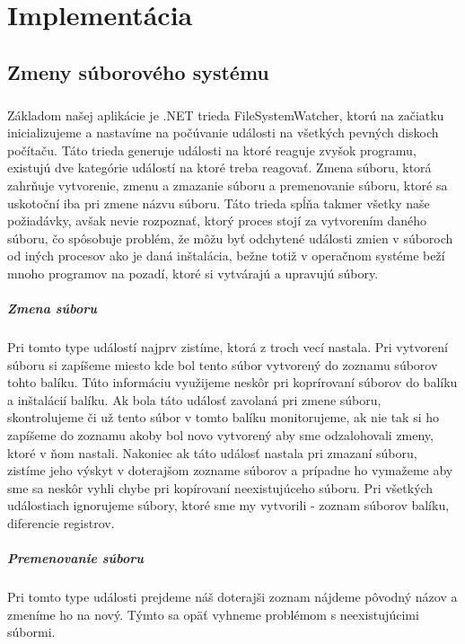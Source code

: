\chapter{Implementácia}

\section{Zmeny súborového systému}
\paragraph{}
Základom našej aplikácie je .NET trieda FileSystemWatcher, ktorú na začiatku inicializujeme a nastavíme na počúvanie události na všetkých pevných diskoch počítaču. Táto trieda generuje události na ktoré reaguje zvyšok programu, existujú dve kategórie událostí na ktoré treba reagovať. Zmena súboru, ktorá zahrňuje vytvorenie, zmenu a zmazanie súboru a premenovanie súboru, ktoré sa uskotoční iba pri zmene názvu súboru. Táto trieda spĺňa takmer všetky naše požiadávky, avšak nevie rozpoznať, ktorý proces stojí za vytvorením daného súboru, čo spôsobuje problém, že môžu byť odchytené události zmien v súboroch od iných procesov ako je daná inštalácia, bežne totiž v operačnom systéme beží mnoho programov na pozadí, ktoré si vytvárajú a upravujú súbory.

\paragraph{Zmena súboru}
Pri tomto type událostí najprv zistíme, ktorá z troch vecí nastala. Pri vytvorení súboru si zapíšeme miesto kde bol tento súbor vytvorený do zoznamu súborov tohto balíku. Túto informáciu využijeme neskôr pri koprírovaní súborov do balíku a inštalácií balíku. Ak bola táto událosť zavolaná pri zmene súboru, skontrolujeme či už tento súbor v tomto balíku monitorujeme, ak nie tak si ho zapíšeme do zoznamu akoby bol novo vytvorený aby sme odzalohovali zmeny, ktoré v ňom nastali. Nakoniec ak táto událosť nastala pri zmazaní súboru, zistíme jeho výskyt v doterajšom zozname súborov a prípadne ho vymažeme aby sme sa neskôr vyhli chybe pri kopírovaní neexistujúceho súboru. Pri všetkých událostiach ignorujeme súbory, ktoré sme my vytvorili - zoznam súborov balíku, diferencie registrov.

\paragraph{Premenovanie súboru}
Pri tomto type události prejdeme náš doterajši zoznam nájdeme pôvodný názov a zmeníme ho na nový. Týmto sa opäť vyhneme problémom s neexistujúcimi súbormi.

